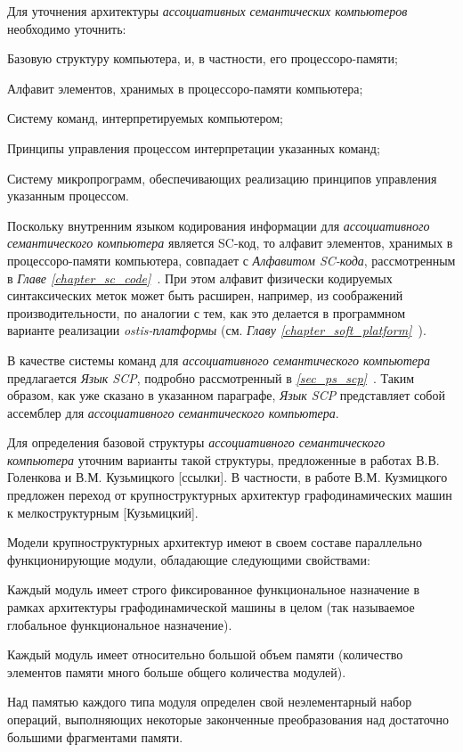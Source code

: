 
Для уточнения архитектуры \textit{ассоциативных семантических компьютеров} необходимо уточнить:
\begin{textitemize}
	\item Базовую структуру компьютера, и, в частности, его процессоро-памяти;
	\item Алфавит элементов, хранимых в процессоро-памяти компьютера;
	\item Систему команд, интерпретируемых компьютером;
	\item Принципы управления процессом интерпретации указанных команд;
	\item Систему микропрограмм, обеспечивающих реализацию принципов управления указанным процессом.
\end{textitemize}

Поскольку внутренним языком кодирования информации для \textit{ассоциативного семантического компьютера} является SC-код, то алфавит элементов, хранимых в процессоро-памяти компьютера, совпадает с \textit{Алфавитом SC-кода}, рассмотренным в \textit{Главе \ref{chapter_sc_code}~}. При этом алфавит физически кодируемых  синтаксических меток может быть расширен, например, из соображений производительности, по аналогии с тем, как это делается в программном варианте реализации \textit{ostis-платформы} (см. \textit{Главу \ref{chapter_soft_platform}~}).

В качестве системы команд для \textit{ассоциативного семантического компьютера} предлагается \textit{Язык SCP}, подробно рассмотренный в \textit{\ref{sec_ps_scp}~}. Таким образом, как уже сказано в указанном параграфе, \textit{Язык SCP} представляет собой ассемблер для \textit{ассоциативного семантического компьютера}.

Для определения базовой структуры \textit{ассоциативного семантического компьютера} уточним варианты такой структуры, предложенные в работах В.В. Голенкова и В.М. Кузьмицкого [ссылки]. В частности, в работе В.М. Кузмицкого предложен переход от крупноструктурных архитектур графодинамических машин к мелкоструктурным [Кузьмицкий].

Модели крупноструктурных архитектур имеют в своем составе параллельно функционирующие модули, обладающие следующими свойствами: 
\begin{textitemize}
	\item Каждый модуль имеет строго фиксированное функциональное назначение в рамках архитектуры графодинамической машины в целом (так называемое глобальное функциональное назначение).
	\item Каждый модуль имеет относительно большой объем памяти (количество элементов памяти много больше общего количества модулей).
	\item Над памятью каждого типа модуля определен свой неэлементарный набор операций, выполняющих некоторые законченные преобразования над достаточно большими фрагментами памяти.
\end{textitemize}

